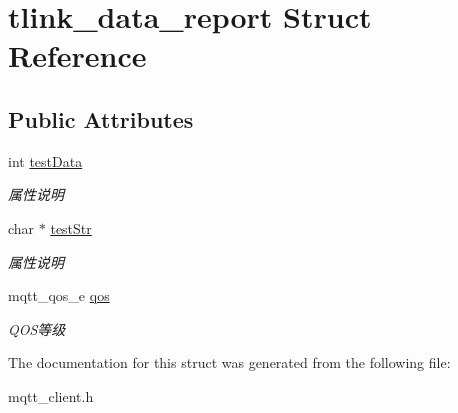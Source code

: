 \hypertarget{structtlink__data__report}{}\section{tlink\+\_\+data\+\_\+report Struct Reference}
\label{structtlink__data__report}
\subsection*{Public Attributes}
\begin{DoxyCompactItemize}
\item 
\mbox{\label{structtlink__data__report_aabd2f91ff8403e97df03fc4a80152711}} 
int \mbox{\hyperlink{structtlink__data__report_aabd2f91ff8403e97df03fc4a80152711}{test\+Data}}
\begin{DoxyCompactList}\small\item\em 属性说明 \end{DoxyCompactList}\item 
\mbox{\label{structtlink__data__report_a4fe7bd8148f60b303f391b247a49137e}} 
char $\ast$ \mbox{\hyperlink{structtlink__data__report_a4fe7bd8148f60b303f391b247a49137e}{test\+Str}}
\begin{DoxyCompactList}\small\item\em 属性说明 \end{DoxyCompactList}\item 
\mbox{\label{structtlink__data__report_a8b855a007176cf693e97dd924adc918e}} 
mqtt\+\_\+qos\+\_\+e \mbox{\hyperlink{structtlink__data__report_a8b855a007176cf693e97dd924adc918e}{qos}}
\begin{DoxyCompactList}\small\item\em Q\+O\+S等级 \end{DoxyCompactList}\end{DoxyCompactItemize}


The documentation for this struct was generated from the following file\+:\begin{DoxyCompactItemize}
\item 
mqtt\+\_\+client.\+h\end{DoxyCompactItemize}
